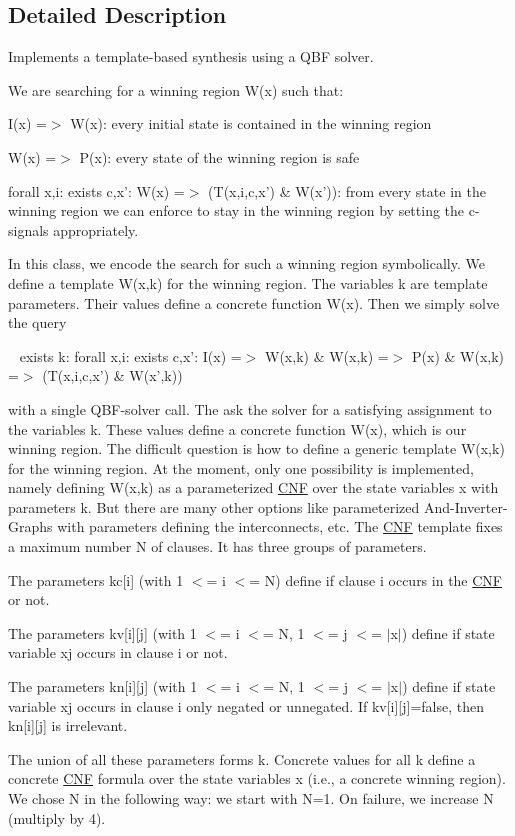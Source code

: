 \subsection{Detailed Description}
Implements a template-\/based synthesis using a Q\-B\-F solver. 

We are searching for a winning region W(x) such that\-: 
\begin{DoxyEnumerate}
\item I(x) =$>$ W(x)\-: every initial state is contained in the winning region 
\item W(x) =$>$ P(x)\-: every state of the winning region is safe 
\item forall x,i\-: exists c,x'\-: W(x) =$>$ (T(x,i,c,x') \& W(x'))\-: from every state in the winning region we can enforce to stay in the winning region by setting the c-\/signals appropriately. 
\end{DoxyEnumerate}In this class, we encode the search for such a winning region symbolically. We define a template W(x,k) for the winning region. The variables k are template parameters. Their values define a concrete function W(x). Then we simply solve the query \par
 ~ exists k\-: forall x,i\-: exists c,x'\-: I(x) =$>$ W(x,k) \& W(x,k) =$>$ P(x) \& W(x,k) =$>$ (T(x,i,c,x') \& W(x',k)) \par
 with a single Q\-B\-F-\/solver call. The ask the solver for a satisfying assignment to the variables k. These values define a concrete function W(x), which is our winning region. The difficult question is how to define a generic template W(x,k) for the winning region. At the moment, only one possibility is implemented, namely defining W(x,k) as a parameterized \hyperlink{classCNF}{C\-N\-F} over the state variables x with parameters k. But there are many other options like parameterized And-\/\-Inverter-\/\-Graphs with parameters defining the interconnects, etc. The \hyperlink{classCNF}{C\-N\-F} template fixes a maximum number N of clauses. It has three groups of parameters. 
\begin{DoxyItemize}
\item The parameters kc\mbox{[}i\mbox{]} (with 1 $<$= i $<$= N) define if clause i occurs in the \hyperlink{classCNF}{C\-N\-F} or not. 
\item The parameters kv\mbox{[}i\mbox{]}\mbox{[}j\mbox{]} (with 1 $<$= i $<$= N, 1 $<$= j $<$= $|$x$|$) define if state variable xj occurs in clause i or not. 
\item The parameters kn\mbox{[}i\mbox{]}\mbox{[}j\mbox{]} (with 1 $<$= i $<$= N, 1 $<$= j $<$= $|$x$|$) define if state variable xj occurs in clause i only negated or unnegated. If kv\mbox{[}i\mbox{]}\mbox{[}j\mbox{]}=false, then kn\mbox{[}i\mbox{]}\mbox{[}j\mbox{]} is irrelevant. 
\end{DoxyItemize}The union of all these parameters forms k. Concrete values for all k define a concrete \hyperlink{classCNF}{C\-N\-F} formula over the state variables x (i.\-e., a concrete winning region). We chose N in the following way\-: we start with N=1. On failure, we increase N (multiply by 4).

